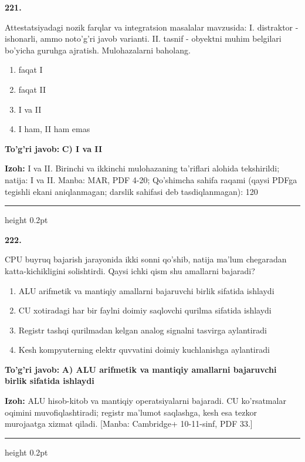 \documentclass[10pt,a4paper]{article}
\begin{document}
{\bfseries\sffamily\color{ink} 221.}
\par
Attestatsiyadagi nozik farqlar va integratsion masalalar mavzusida: I. distraktor - ishonarli, ammo noto'g'ri javob varianti. II. tasnif - obyektni muhim belgilari bo'yicha guruhga ajratish. Mulohazalarni baholang.
\begin{enumerate}[label=\Alph*),leftmargin=9mm]
\item faqat I
\item faqat II
\item I va II
\item I ham, II ham emas
\end{enumerate}
\begin{tcolorbox}[enhanced,breakable,colback=teal!4,colframe=teal!60!black,boxrule=0.45pt,arc=1.2mm,left=2.7mm,right=2.7mm,top=1.8mm,bottom=1.8mm,before skip=2mm,after skip=2mm]
{\bfseries\sffamily\color{teal}To'g'ri javob:} \textbf{C) I va II}
\par\smallskip
{\bfseries Izoh:} I va II. Birinchi va ikkinchi mulohazaning ta'riflari alohida tekshirildi; natija: I va II. Manba: MAR, PDF 4-20; Qo'shimcha sahifa raqami (qaysi PDFga tegishli ekani aniqlanmagan; darslik sahifasi deb tasdiqlanmagan): 120
\end{tcolorbox}
\vspace{2mm}\hrule height 0.2pt\vspace{3mm}

{\bfseries\sffamily\color{ink} 222.}
\par
CPU buyruq bajarish jarayonida ikki sonni qo'shib, natija ma'lum chegaradan katta-kichikligini solishtirdi. Qaysi ichki qism shu amallarni bajaradi?
\begin{enumerate}[label=\Alph*),leftmargin=9mm]
\item ALU arifmetik va mantiqiy amallarni bajaruvchi birlik sifatida ishlaydi
\item CU xotiradagi har bir faylni doimiy saqlovchi qurilma sifatida ishlaydi
\item Registr tashqi qurilmadan kelgan analog signalni tasvirga aylantiradi
\item Kesh kompyuterning elektr quvvatini doimiy kuchlanishga aylantiradi
\end{enumerate}
\begin{tcolorbox}[enhanced,breakable,colback=teal!4,colframe=teal!60!black,boxrule=0.45pt,arc=1.2mm,left=2.7mm,right=2.7mm,top=1.8mm,bottom=1.8mm,before skip=2mm,after skip=2mm]
{\bfseries\sffamily\color{teal}To'g'ri javob:} \textbf{A) ALU arifmetik va mantiqiy amallarni bajaruvchi birlik sifatida ishlaydi}
\par\smallskip
{\bfseries Izoh:} ALU hisob-kitob va mantiqiy operatsiyalarni bajaradi. CU ko'rsatmalar oqimini muvofiqlashtiradi; registr ma'lumot saqlashga, kesh esa tezkor murojaatga xizmat qiladi. [Manba: Cambridge+ 10-11-sinf, PDF 33.]
\end{tcolorbox}
\vspace{2mm}\hrule height 0.2pt\vspace{3mm}
\end{document}
